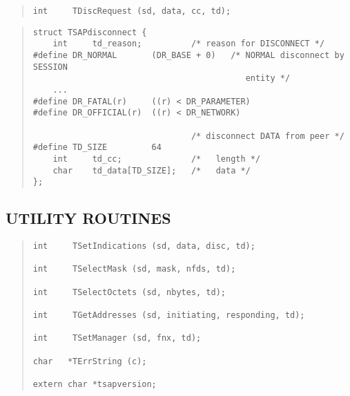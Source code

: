 \begin{bwslide}

\begin{quote}\small\begin{verbatim}
int     TDiscRequest (sd, data, cc, td);
\end{verbatim}\end{quote}
\end{bwslide}


\begin{bwslide}

\begin{quote}\small\begin{verbatim}
struct TSAPdisconnect {
    int     td_reason;          /* reason for DISCONNECT */
#define DR_NORMAL       (DR_BASE + 0)   /* NORMAL disconnect by SESSION
                                           entity */
    ...
#define DR_FATAL(r)     ((r) < DR_PARAMETER)
#define DR_OFFICIAL(r)  ((r) < DR_NETWORK)

                                /* disconnect DATA from peer */
#define TD_SIZE         64
    int     td_cc;              /*   length */
    char    td_data[TD_SIZE];   /*   data */
};
\end{verbatim}\end{quote}
\end{bwslide}


\begin{bwslide}
\part*	{UTILITY ROUTINES}\bf

\begin{quote}\small\begin{verbatim}
int     TSetIndications (sd, data, disc, td);

int     TSelectMask (sd, mask, nfds, td);

int     TSelectOctets (sd, nbytes, td);

int     TGetAddresses (sd, initiating, responding, td);

int     TSetManager (sd, fnx, td);

char   *TErrString (c);

extern char *tsapversion;
\end{verbatim}\end{quote}
\end{bwslide}



